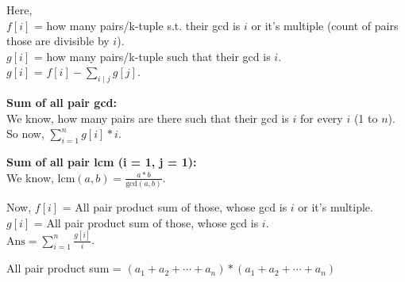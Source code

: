 Here, \\ 
$f[i]$ = how many pairs/k-tuple s.t. their gcd is $i$ or it’s multiple (count of pairs those are divisible by $i$). \\ 
$g[i]$ = how many pairs/k-tuple such that their gcd is $i$. \\ 
$g[i]$ = $f[i] - \sum_{i \mid j} g[j]$. \\

\medskip

\textbf{Sum of all pair gcd:} \\

We know, how many pairs are there such that their gcd is $i$ for every $i$ (1 to $n$). So now,  
$\sum_{i=1}^{n} g[i] * i$. \\

\medskip

\textbf{Sum of all pair lcm (i = 1, j = 1):} \\
We know, 
$\text{lcm}(a, b) = \frac{a * b}{\text{gcd}(a,b)}$. \\
\medskip

Now, $f[i]$ = All pair product sum of those, whose gcd is $i$ or it’s multiple. \\ 
$g[i]$ = All pair product sum of those, whose gcd is $i$. \\

$\text{Ans} = \sum_{i=1}^{n} \frac{g[i]}{i}$. \\
\medskip

All pair product sum = $(a_1 + a_2 + \cdots + a_n) * (a_1 + a_2 + \cdots + a_n)$

